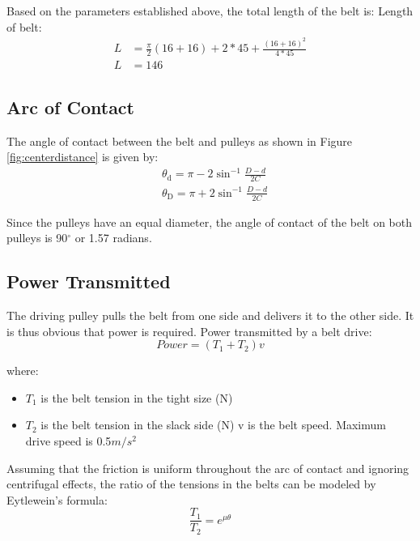 Based on the parameters established above, the total length of the belt is: 
Length of belt:
\begin{equation} \label{eu_eqn}
    \begin{aligned}
        L &= \frac{\pi}{2}(16 + 16) + 2*45 + \frac{(16 + 16)^2}{4*45}\\
        L& = 146
    \end{aligned}
\end{equation}

\subsection{Arc of Contact}

The angle of contact between the belt and pulleys as shown in Figure \ref{fig:centerdistance} is given by:
\begin{equation} \label{eqn4}
    \begin{aligned}
        &\theta_{\mathrm{d}}=\pi-2 \sin ^{-1} \frac{D-d}{2 C} \\
        &\theta_{\mathrm{D}}=\pi+2 \sin ^{-1} \frac{D-d}{2 C}
    \end{aligned}
\end{equation}


Since the pulleys have an equal diameter, the angle of contact of the belt on both pulleys is 90$^{\circ}$  or 1.57 radians.

\subsection{Power Transmitted}
The driving pulley pulls the belt from one side and delivers it to the other side. It is thus obvious that power is required. Power transmitted by a belt drive:
\begin{equation}
    Power = (T_1 + T_2)v
\end{equation}

where:
\begin{itemize}
    \item \(T_1\) is the belt tension in the tight size (N)
    \item \(T_2\) is the belt tension in the slack side (N)
    v is the belt speed. Maximum drive speed is 0.5\(m/s^2\)
\end{itemize}

Assuming that the friction is uniform throughout the arc of contact and ignoring centrifugal effects, the ratio of the tensions in the belts can be modeled by Eytlewein’s formula:
\begin{equation}
    \frac{T_1}{T_2} = e^{\mu \theta}
\end{equation}

